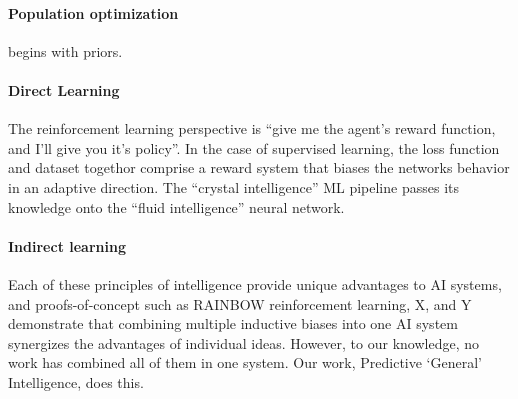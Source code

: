 \paragraph{Population optimization} begins with priors. 

\paragraph{Direct Learning} 

The reinforcement learning perspective is ``give me the agent's reward function, and I'll give you it's policy''. In the case of supervised learning, the loss function and dataset togethor comprise a reward system that biases the networks behavior in an adaptive direction. The ``crystal intelligence'' ML pipeline passes its knowledge onto the ``fluid intelligence'' neural network.

\paragraph{Indirect learning} 

    
Each of these principles of intelligence provide unique advantages to AI systems, and proofs-of-concept such as RAINBOW reinforcement learning, X, and Y demonstrate that combining multiple inductive biases into one AI system synergizes the advantages of individual ideas. However, to our knowledge, no work has combined all of them in one system. Our work, Predictive ‘General’ Intelligence, does this. 
